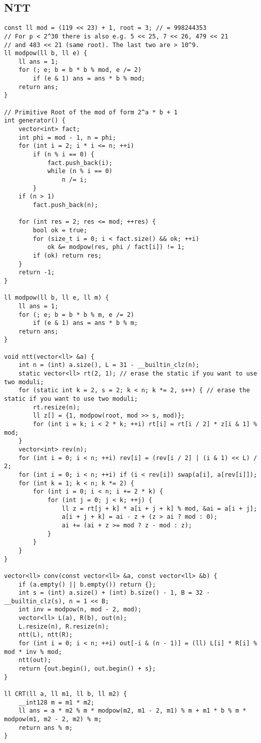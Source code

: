 \documentclass{article}
\begin{document}
\subsection{NTT}
\begin{verbatim}
const ll mod = (119 << 23) + 1, root = 3; // = 998244353
// For p < 2^30 there is also e.g. 5 << 25, 7 << 26, 479 << 21
// and 483 << 21 (same root). The last two are > 10^9.
ll modpow(ll b, ll e) {
    ll ans = 1;
    for (; e; b = b * b % mod, e /= 2)
        if (e & 1) ans = ans * b % mod;
    return ans;
}

// Primitive Root of the mod of form 2^a * b + 1
int generator() {
    vector<int> fact;
    int phi = mod - 1, n = phi;
    for (int i = 2; i * i <= n; ++i)
        if (n % i == 0) {
            fact.push_back(i);
            while (n % i == 0)
                n /= i;
        }
    if (n > 1)
        fact.push_back(n);

    for (int res = 2; res <= mod; ++res) {
        bool ok = true;
        for (size_t i = 0; i < fact.size() && ok; ++i)
            ok &= modpow(res, phi / fact[i]) != 1;
        if (ok) return res;
    }
    return -1;
}

ll modpow(ll b, ll e, ll m) {
    ll ans = 1;
    for (; e; b = b * b % m, e /= 2)
        if (e & 1) ans = ans * b % m;
    return ans;
}

void ntt(vector<ll> &a) {
    int n = (int) a.size(), L = 31 - __builtin_clz(n);
    static vector<ll> rt(2, 1); // erase the static if you want to use two moduli;
    for (static int k = 2, s = 2; k < n; k *= 2, s++) { // erase the static if you want to use two moduli;
        rt.resize(n);
        ll z[] = {1, modpow(root, mod >> s, mod)};
        for (int i = k; i < 2 * k; ++i) rt[i] = rt[i / 2] * z[i & 1] % mod;
    }
    vector<int> rev(n);
    for (int i = 0; i < n; ++i) rev[i] = (rev[i / 2] | (i & 1) << L) / 2;
    for (int i = 0; i < n; ++i) if (i < rev[i]) swap(a[i], a[rev[i]]);
    for (int k = 1; k < n; k *= 2) {
        for (int i = 0; i < n; i += 2 * k) {
            for (int j = 0; j < k; ++j) {
                ll z = rt[j + k] * a[i + j + k] % mod, &ai = a[i + j];
                a[i + j + k] = ai - z + (z > ai ? mod : 0);
                ai += (ai + z >= mod ? z - mod : z);
            }
        }
    }
}

vector<ll> conv(const vector<ll> &a, const vector<ll> &b) {
    if (a.empty() || b.empty()) return {};
    int s = (int) a.size() + (int) b.size() - 1, B = 32 - __builtin_clz(s), n = 1 << B;
    int inv = modpow(n, mod - 2, mod);
    vector<ll> L(a), R(b), out(n);
    L.resize(n), R.resize(n);
    ntt(L), ntt(R);
    for (int i = 0; i < n; ++i) out[-i & (n - 1)] = (ll) L[i] * R[i] % mod * inv % mod;
    ntt(out);
    return {out.begin(), out.begin() + s};
}

ll CRT(ll a, ll m1, ll b, ll m2) {
    __int128 m = m1 * m2;
    ll ans = a * m2 % m * modpow(m2, m1 - 2, m1) % m + m1 * b % m * modpow(m1, m2 - 2, m2) % m;
    return ans % m;
}
\end{verbatim}
\end{document}
